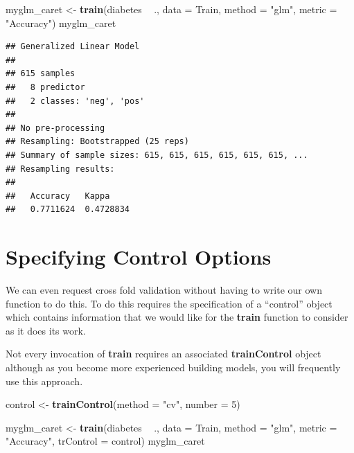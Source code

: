 \documentclass[]{book}
\newenvironment{Shaded}{\begin{snugshade}}{\end{snugshade}}
\newcommand{\KeywordTok}[1]{\textcolor[rgb]{0.13,0.29,0.53}{\textbf{#1}}}
\newcommand{\DataTypeTok}[1]{\textcolor[rgb]{0.13,0.29,0.53}{#1}}
\newcommand{\DecValTok}[1]{\textcolor[rgb]{0.00,0.00,0.81}{#1}}
\newcommand{\StringTok}[1]{\textcolor[rgb]{0.31,0.60,0.02}{#1}}
\newcommand{\OperatorTok}[1]{\textcolor[rgb]{0.81,0.36,0.00}{\textbf{#1}}}
\newcommand{\NormalTok}[1]{#1}
\begin{document}
\begin{Shaded}
\begin{Highlighting}[]
\NormalTok{myglm_caret <-}\StringTok{ }\KeywordTok{train}\NormalTok{(diabetes }\OperatorTok{~}\StringTok{ }\NormalTok{.,}
                     \DataTypeTok{data =}\NormalTok{ Train,}
                     \DataTypeTok{method =} \StringTok{"glm"}\NormalTok{,}
                     \DataTypeTok{metric =} \StringTok{"Accuracy"}\NormalTok{)}
\NormalTok{myglm_caret}
\end{Highlighting}
\end{Shaded}

\begin{verbatim}
## Generalized Linear Model 
## 
## 615 samples
##   8 predictor
##   2 classes: 'neg', 'pos' 
## 
## No pre-processing
## Resampling: Bootstrapped (25 reps) 
## Summary of sample sizes: 615, 615, 615, 615, 615, 615, ... 
## Resampling results:
## 
##   Accuracy   Kappa    
##   0.7711624  0.4728834
\end{verbatim}

\section{Specifying Control Options}\label{specifying-control-options}

We can even request cross fold validation without having to write our
own function to do this. To do this requires the specification of a
``control'' object which contains information that we would like for the
\textbf{train} function to consider as it does its work.

Not every invocation of \textbf{train} requires an associated
\textbf{trainControl} object although as you become more experienced
building models, you will frequently use this approach.

\begin{Shaded}
\begin{Highlighting}[]
\NormalTok{control <-}\StringTok{ }\KeywordTok{trainControl}\NormalTok{(}\DataTypeTok{method =} \StringTok{"cv"}\NormalTok{, }\DataTypeTok{number =} \DecValTok{5}\NormalTok{)}

\NormalTok{myglm_caret <-}\StringTok{ }\KeywordTok{train}\NormalTok{(diabetes }\OperatorTok{~}\StringTok{ }\NormalTok{.,}
                     \DataTypeTok{data =}\NormalTok{ Train,}
                     \DataTypeTok{method =} \StringTok{"glm"}\NormalTok{,}
                     \DataTypeTok{metric =} \StringTok{"Accuracy"}\NormalTok{,}
                     \DataTypeTok{trControl =}\NormalTok{ control)}
\NormalTok{myglm_caret}
\end{Highlighting}
\end{Shaded}
\end{document}
